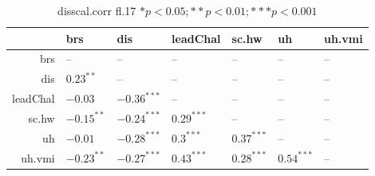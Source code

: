 \begin{table}[ht]
\centering
\begin{tabular}{rllllll}
  \hline
 & brs & dis & leadChal & sc.hw & uh & uh.vmi \\ 
  \hline
brs & -- & -- & -- & -- & -- & -- \\ 
  dis & $0.23^{**}$ & -- & -- & -- & -- & -- \\ 
  leadChal & $-0.03$ & $-0.36^{***}$ & -- & -- & -- & -- \\ 
  sc.hw & $-0.15^{**}$ & $-0.24^{***}$ & $0.29^{***}$ & -- & -- & -- \\ 
  uh & $-0.01$ & $-0.28^{***}$ & $0.3^{***}$ & $0.37^{***}$ & -- & -- \\ 
  uh.vmi & $-0.23^{**}$ & $-0.27^{***}$ & $0.43^{***}$ & $0.28^{***}$ & $0.54^{***}$ & -- \\ 
   \hline
\end{tabular}
\caption{disscal.corr fl.17 $* p < 0.05; ** p < 0.01; *** p < 0.001$} 
\label{freq_corr.disscal.corr.fl.17}
\end{table}
